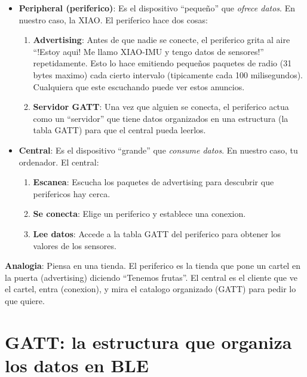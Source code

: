 \documentclass[11pt,a4paper]{article}
\begin{document}
\begin{itemize}
    \item \textbf{Peripheral (periferico)}: Es el dispositivo
          ``pequeño'' que \emph{ofrece datos}. En nuestro caso,
          la XIAO. El periferico hace dos cosas:

    \begin{enumerate}
        \item \textbf{Advertising}: Antes de que nadie se conecte,
              el periferico grita al aire ``!Estoy aqui! Me llamo
              XIAO-IMU y tengo datos de sensores!'' repetidamente.
              Esto lo hace emitiendo pequeños paquetes de radio
              (31 bytes maximo) cada cierto intervalo (tipicamente
              cada 100 milisegundos). Cualquiera que este escuchando
              puede ver estos anuncios.

        \item \textbf{Servidor GATT}: Una vez que alguien se conecta,
              el periferico actua como un ``servidor'' que tiene
              datos organizados en una estructura (la tabla GATT)
              para que el central pueda leerlos.
    \end{enumerate}

    \item \textbf{Central}: Es el dispositivo ``grande'' que
          \emph{consume datos}. En nuestro caso, tu ordenador.
          El central:

    \begin{enumerate}
        \item \textbf{Escanea}: Escucha los paquetes de advertising
              para descubrir que perifericos hay cerca.
        \item \textbf{Se conecta}: Elige un periferico y establece
              una conexion.
        \item \textbf{Lee datos}: Accede a la tabla GATT del
              periferico para obtener los valores de los sensores.
    \end{enumerate}
\end{itemize}

\textbf{Analogia}: Piensa en una tienda. El periferico es la tienda
que pone un cartel en la puerta (advertising) diciendo ``Tenemos
frutas''. El central es el cliente que ve el cartel, entra (conexion),
y mira el catalogo organizado (GATT) para pedir lo que quiere.


\section{GATT: la estructura que organiza los datos en BLE}
\end{document}
